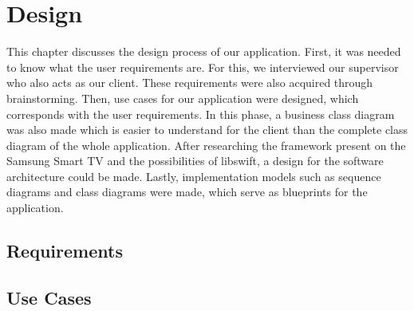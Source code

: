 \chapter{Design}
This chapter discusses the design process of our application. First, it was needed to know what the user requirements are. For this, we interviewed our supervisor who also acts as our client. These requirements were also acquired through brainstorming. Then, use cases for our application were designed, which corresponds with the user requirements. In this phase, a business class diagram was also made which is easier to understand for the client than the complete class diagram of the whole application. After researching the framework present on the Samsung Smart TV and the possibilities of libswift, a design for the software architecture could be made. Lastly, implementation models such as sequence diagrams and class diagrams were made, which serve as blueprints for the application.

\section{Requirements}

\section{Use Cases}

